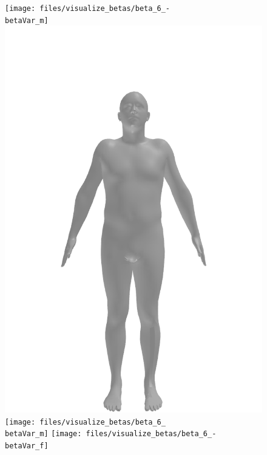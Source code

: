 \begin{figure}[ht!]
    \centering

    \begin{minipage}[b]{\textwidth}
        \centering
        \texttt{[image: files/visualize\_betas/beta\_6\_-\\betaVar\_m]}
        \includegraphics[width=\imgWidth]{files/visualize_betas/baseline_m}
        \texttt{[image: files/visualize\_betas/beta\_6\_\\betaVar\_m]}
        \linebreak
        \texttt{[image: files/visualize\_betas/beta\_6\_-\\betaVar\_f]}

\end{minipage}
\end{figure}

